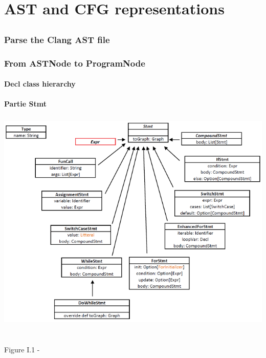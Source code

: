 \documentclass{report}
\begin{document}
\chapter{AST and CFG representations}

\paragraph{}
\hspace{4mm}\textnormal{}

\section{}

\subsection{Parse the Clang AST file}

\subsection{From ASTNode to ProgramNode}

\subsubsection{\textbf{Decl} class hierarchy}

\subsubsection{Partie \textbf{Stmt}}

\paragraph{}
\hspace{4mm}\textnormal{}

\begin{center}
\includegraphics[scale=0.9]{data/stmt.png}
~\\~\\Figure I.1 - 
\end{center}
\end{document}
